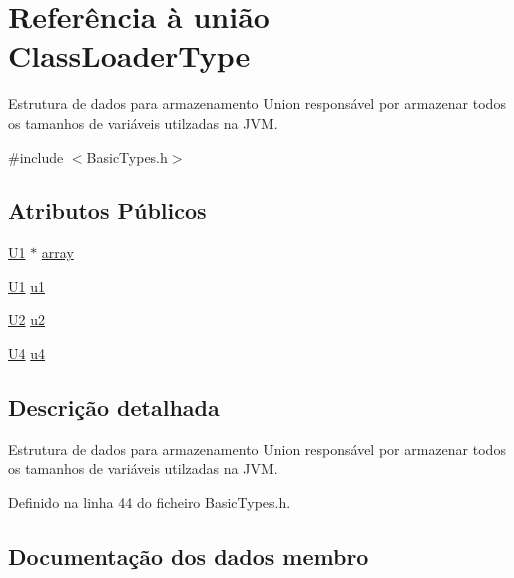 \hypertarget{unionClassLoaderType}{}\section{Referência à união Class\+Loader\+Type}
\label{unionClassLoaderType}


Estrutura de dados para armazenamento Union responsável por armazenar todos os tamanhos de variáveis utilzadas na J\+VM.  




{\ttfamily \#include $<$Basic\+Types.\+h$>$}

\subsection*{Atributos Públicos}
\begin{DoxyCompactItemize}
\item 
\hyperlink{BasicTypes_8h_a9bffe5bb2564f91cd90fb7d06848f9a8}{U1} $\ast$ \hyperlink{unionClassLoaderType_a35ae4ff3dac1fe01b69c3649e200790c}{array}
\item 
\hyperlink{BasicTypes_8h_a9bffe5bb2564f91cd90fb7d06848f9a8}{U1} \hyperlink{unionClassLoaderType_ac3612ba54bfba5c4b856dcba8db1a8a8}{u1}
\item 
\hyperlink{BasicTypes_8h_a90240657108b1b457eef9d3f76e0202e}{U2} \hyperlink{unionClassLoaderType_aaf24600dbc4afe99210fa000bdb1e6d7}{u2}
\item 
\hyperlink{BasicTypes_8h_ac6d2ba2e53dd424684ead2f40e74a8b6}{U4} \hyperlink{unionClassLoaderType_aad01cfe6aac48729f55425b67a70622e}{u4}
\end{DoxyCompactItemize}


\subsection{Descrição detalhada}
Estrutura de dados para armazenamento Union responsável por armazenar todos os tamanhos de variáveis utilzadas na J\+VM. 

Definido na linha 44 do ficheiro Basic\+Types.\+h.



\subsection{Documentação dos dados membro}
\mbox{\label{unionClassLoaderType_a35ae4ff3dac1fe01b69c3649e200790c}} 

